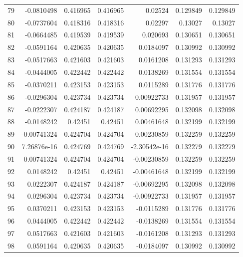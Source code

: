 \begin{tabular}{rrrrrrr}
  79 & -0.0810498   & 0.416965    & 0.416965    &  0.02524     & 0.129849    & 0.129849    \\
  80 & -0.0737604   & 0.418316    & 0.418316    &  0.02297     & 0.13027     & 0.13027     \\
  81 & -0.0664485   & 0.419539    & 0.419539    &  0.020693    & 0.130651    & 0.130651    \\
  82 & -0.0591164   & 0.420635    & 0.420635    &  0.0184097   & 0.130992    & 0.130992    \\
  83 & -0.0517663   & 0.421603    & 0.421603    &  0.0161208   & 0.131293    & 0.131293    \\
  84 & -0.0444005   & 0.422442    & 0.422442    &  0.0138269   & 0.131554    & 0.131554    \\
  85 & -0.0370211   & 0.423153    & 0.423153    &  0.0115289   & 0.131776    & 0.131776    \\
  86 & -0.0296304   & 0.423734    & 0.423734    &  0.00922733  & 0.131957    & 0.131957    \\
  87 & -0.0222307   & 0.424187    & 0.424187    &  0.00692295  & 0.132098    & 0.132098    \\
  88 & -0.0148242   & 0.42451     & 0.42451     &  0.00461648  & 0.132199    & 0.132199    \\
  89 & -0.00741324  & 0.424704    & 0.424704    &  0.00230859  & 0.132259    & 0.132259    \\
  90 &  7.26876e-16 & 0.424769    & 0.424769    & -2.30542e-16 & 0.132279    & 0.132279    \\
  91 &  0.00741324  & 0.424704    & 0.424704    & -0.00230859  & 0.132259    & 0.132259    \\
  92 &  0.0148242   & 0.42451     & 0.42451     & -0.00461648  & 0.132199    & 0.132199    \\
  93 &  0.0222307   & 0.424187    & 0.424187    & -0.00692295  & 0.132098    & 0.132098    \\
  94 &  0.0296304   & 0.423734    & 0.423734    & -0.00922733  & 0.131957    & 0.131957    \\
  95 &  0.0370211   & 0.423153    & 0.423153    & -0.0115289   & 0.131776    & 0.131776    \\
  96 &  0.0444005   & 0.422442    & 0.422442    & -0.0138269   & 0.131554    & 0.131554    \\
  97 &  0.0517663   & 0.421603    & 0.421603    & -0.0161208   & 0.131293    & 0.131293    \\
  98 &  0.0591164   & 0.420635    & 0.420635    & -0.0184097   & 0.130992    & 0.130992    \\

\end{tabular}
